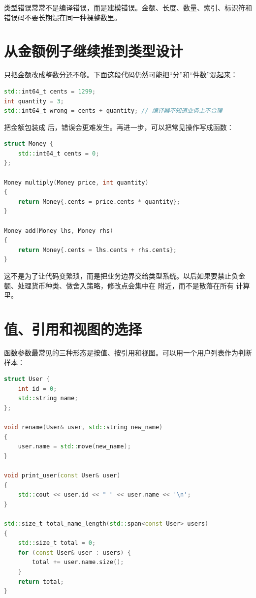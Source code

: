 \begin{warningbox}
类型错误常常不是编译错误，而是建模错误。金额、长度、数量、索引、标识符和错误码不要长期混在同一种裸整数里。
\end{warningbox}

\section{从金额例子继续推到类型设计}

只把金额改成整数分还不够。下面这段代码仍然可能把“分”和“件数”混起来：

\begin{lstlisting}[language=C++,caption={裸整数仍然容易混淆含义}]
std::int64_t cents = 1299;
int quantity = 3;
std::int64_t wrong = cents + quantity; // 编译器不知道业务上不合理
\end{lstlisting}

把金额包装成  后，错误会更难发生。再进一步，可以把常见操作写成函数：

\begin{lstlisting}[language=C++,caption={让金额操作表达业务含义}]
struct Money {
    std::int64_t cents = 0;
};

Money multiply(Money price, int quantity)
{
    return Money{.cents = price.cents * quantity};
}

Money add(Money lhs, Money rhs)
{
    return Money{.cents = lhs.cents + rhs.cents};
}
\end{lstlisting}

这不是为了让代码变繁琐，而是把业务边界交给类型系统。以后如果要禁止负金额、处理货币种类、做舍入策略，修改点会集中在  附近，而不是散落在所有  计算里。

\section{值、引用和视图的选择}

函数参数最常见的三种形态是按值、按引用和视图。可以用一个用户列表作为判断样本：

\begin{lstlisting}[language=C++,caption={三种参数形态表达不同意图}]
struct User {
    int id = 0;
    std::string name;
};

void rename(User& user, std::string new_name)
{
    user.name = std::move(new_name);
}

void print_user(const User& user)
{
    std::cout << user.id << " " << user.name << '\n';
}

std::size_t total_name_length(std::span<const User> users)
{
    std::size_t total = 0;
    for (const User& user : users) {
        total += user.name.size();
    }
    return total;
}
\end{lstlisting}

